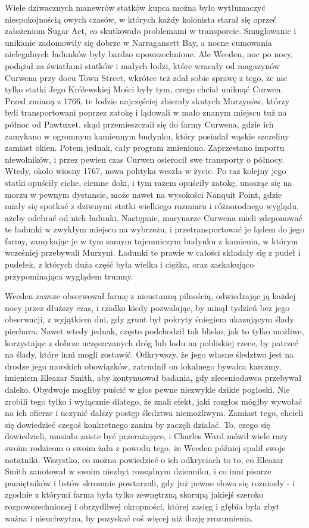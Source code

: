 Wiele dziwacznych manewrów statków kupca można było wytłumaczyć niespokojnością owych czasów, w których każdy kolonista starał się oprzeć założeniom Sugar Act, co skutkowało problemami w transporcie. Smuglowanie i unikanie zadomowiły się dobrze w Narragansett Bay, a nocne cumowania nielegalnych ładunków były bardzo upowszechnione. Ale Weeden, noc po nocy, podążał za światłami statków i małych łodzi, które wracały od magazynów Curwena przy docu Town Street, wkrótce też zdał sobie sprawę z tego, że nie tylko statki Jego Królewskiej Mości były tym, czego chciał uniknąć Curwen. Przed zmianą z 1766, te łodzie najczęściej zbierały skutych Murzynów, którzy byli transportowani poprzez zatokę i lądowali w mało znanym miejscu tuż na północ od Pawtuxet, skąd przemieszczali się do farmy Curwena, gdzie ich zamykano w ogromnym kamiennym budynku, który posiadał wąskie szczeliny zamiast okien. Potem jednak, cały program zmieniono. Zaprzestano importu niewolników, i przez pewien czas Curwen osierocił swe transporty o północy. Wtedy, około wiosny 1767, nowa polityka weszła w życie. Po raz kolejny jego statki opuściły ciche, ciemne doki, i tym razem opuściły zatokę, unosząc się na morzu w pewnym dystansie, może nawet na wysokości Nanquit Point, gdzie miały się spotkać z dziwnymi statki wielkiego rozmiaru i różnorodnego wyglądu, ażeby odebrać od nich ładunki. Następnie, marynarze Curwena mieli zdeponować te ładunki w zwykłym miejscu na wybrzeżu, i przetransportować je lądem do jego farmy, zamykając je w tym samym tajemniczym budynku z kamienia, w którym wcześniej przebywali Murzyni. Ładunki te prawie w całości składały się z pudeł i pudełek, z których duża część była wielka i ciężka, oraz zaskakująco przypominająca wyglądem trumny.

Weeden zawsze obserwował farmę z nieustanną pilnością, odwiedzając ją każdej nocy przez dłuższy czas, i rzadko kiedy pozwalając, by minął tydzień bez jego obserwacji, z wyjątkiem dni, gdy grunt był pokryty śniegiem ukazującym ślady piechura. Nawet wtedy jednak, często podchodził tak blisko, jak to tylko możliwe, korzystając z dobrze uczęszczanych dróg lub lodu na pobliskiej rzece, by patrzeć na ślady, które inni mogli zostawić. Odkrywszy, że jego własne śledztwo jest na drodze jego morskich obowiązków, zatrudnił on lokalnego bywalca karczmy, imieniem Eleazar Smith, aby kontynuował badania, gdy zleceniodawca przebywał daleko. Obydwoje mogliby puścić w głos pewne niezwykle dzikie pogłoski. Nie zrobili tego tylko i wyłącznie dlatego, że znali efekt, jaki rozgłos mógłby wywołać na ich ofierze i uczynić dalszy postęp śledztwa niemożliwym. Zamiast tego, chcieli się dowiedzieć czegoś konkretnego zanim by zaczęli działać. To, czego się dowiedzieli, musiało zaiste być przerażające, i Charles Ward mówił wiele razy swoim rodzicom o swoim żalu z powodu tego, że Weeden później spalił swoje notatniki. Wszystko, co można powiedzieć o ich odkryciach to to, co Eleazar Smith zanotował w swoim niezbyt rozsądnym dzienniku,  i co inni pisarze pamiętników i listów skromnie powtarzali, gdy już pewne słowa się rozniosły - i zgodnie z którymi farma była tylko zewnętrzną skorupą jakiejś szeroko rozpowszechnionej i obrzydliwej okropności, której zasięg i głębia była zbyt ważna i nieuchwytna, by pozyskać coś więcej niż iluzję zrozumienia. 

